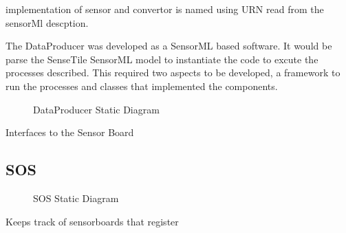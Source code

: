 \documentclass[]{final_report}
\begin{document}
implementation of sensor and convertor is named using URN read from the sensorMl descption.


The DataProducer was developed as a SensorML based software. It would be parse the SenseTile SensorML model to instantiate the code to excute the processes described. This required two aspects to be developed, a framework to run the processes and classes that implemented the components.

\begin{figure}[h]
\caption{DataProducer Static Diagram}\label{fig:bon_static_diagam_producer.png}
\end{figure}

Interfaces to the Sensor Board


\newpage
\subsection {SOS}
 \begin{figure}[h!]
\caption{SOS Static Diagram}\label{fig:bon_static_diagam_provider.png}
\end{figure}
Keeps track of sensorboards that register
\end{document}
